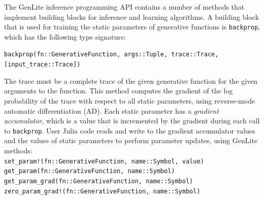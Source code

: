 The GenLite inference programming API contains a number of methods that implement building blocks for inference and learning algorithms.
A building block that is used for training the static parameters of generative functions is \texttt{backprop}, which has the following type signature:
\begin{center}
    \texttt{backprop(fn::GenerativeFunction, args::Tuple, trace::Trace, [input\_trace::Trace])}
\end{center}
The trace must be a complete trace of the given generative function for the given arguments to the function.
This method computes the gradient of the log probability of the trace with respect to all static parameters, using reverse-mode automatic differentiation (AD).
Each static parameter has a \emph{gradient accumulator}, which is a value that is incremented by the gradient during each call to \texttt{backprop}.
User Julia code reads and write to the gradient accumulator values and the values of static parameters to perform parameter updates, using GenLite methods:\\
\texttt{set\_param!(fn::GenerativeFunction, name::Symbol, value)}\\
\texttt{get\_param(fn::GenerativeFunction, name::Symbol)}\\
\texttt{get\_param\_grad(fn::GenerativeFunction, name::Symbol)}\\
\texttt{zero\_param\_grad!(fn::GenerativeFunction, name::Symbol)}

